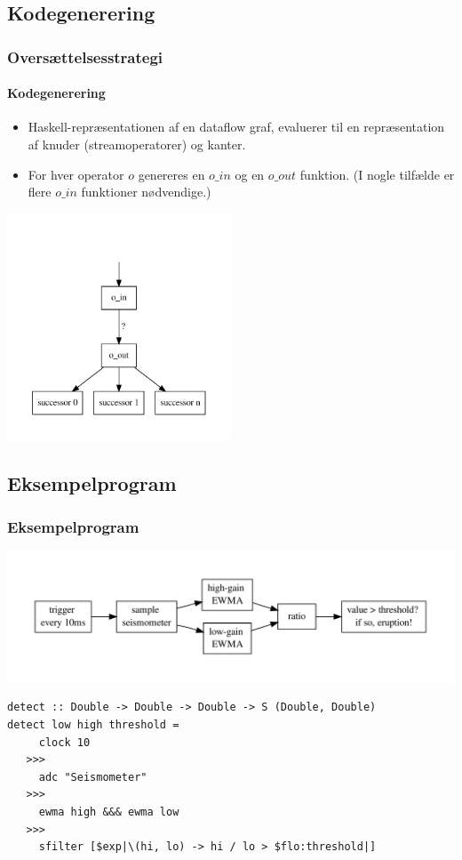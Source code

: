 \documentclass{beamer}
\begin{document}
\subsection{Kodegenerering}
\begin{frame}[t]
  \frametitle{Oversættelsesstrategi} 
  \framesubtitle{Kodegenerering}

  \begin{itemize}
  \item Haskell-repræsentationen af en dataflow graf, evaluerer til en
    repræsentation af knuder (streamoperatorer) og kanter.
  \item For hver operator $o$ genereres en $o\_in$ og en $o\_out$
    funktion. (I nogle tilfælde er flere $o\_in$ funktioner
    nødvendige.)
  \end{itemize}
\pause
  \begin{center}
      \includegraphics[width=0.5\textwidth]{kode}
  \end{center}

\end{frame}

\subsection{Eksempelprogram}
\begin{frame}[t, fragile]
  \frametitle{Eksempelprogram} 

  \includegraphics[width=\textwidth]{flask-ewma}
\pause
\tiny
\begin{verbatim}
detect :: Double -> Double -> Double -> S (Double, Double)
detect low high threshold = 
     clock 10
   >>>
     adc "Seismometer"
   >>>
     ewma high &&& ewma low
   >>>
     sfilter [$exp|\(hi, lo) -> hi / lo > $flo:threshold|]
\end{verbatim}

\normalsize

\end{frame}
\end{document}
